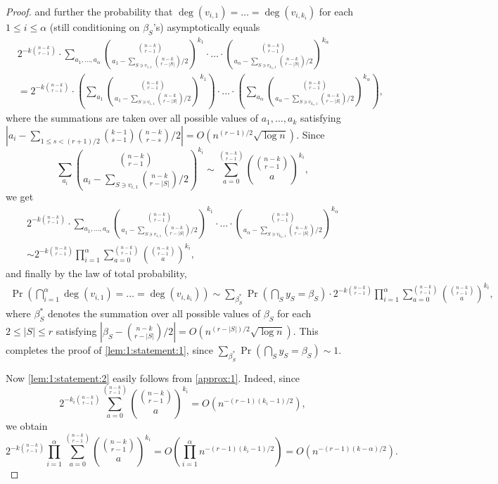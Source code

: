 \documentclass[12pt,reqno]{amsart}
\begin{document}
\begin{proof}
and further the probability that $\deg(v_{i,1}) = \dots = \deg(v_{i,k_i})$ for each $1\le i\le \alpha$ (still conditioning on $\beta_S$'s) asymptotically equals
\begin{align*}
&2^{-k\binom{n-k}{r-1}} \cdot \sum_{a_1,\dots,a_{\alpha}} \binom{\binom{n-k}{r-1}}{a_1-\sum_{S\ni v_{1,1}} {\binom{n-k}{r-|S|}}/{2}}^{k_1} \cdot \ldots \cdot \binom{\binom{n-k}{r-1}}{a_\alpha-\sum_{S\ni v_{k_\alpha,1}} {\binom{n-k}{r-|S|}}/{2}}^{k_\alpha}\\
&=2^{-k\binom{n-k}{r-1}} \cdot \left(\sum_{a_1}\binom{\binom{n-k}{r-1}}{a_1-\sum_{S\ni v_{1,1}} {\binom{n-k}{r-|S|}}/{2}}^{k_1}\right) \cdot \ldots \cdot\left(\sum_{a_{\alpha}} \binom{\binom{n-k}{r-1}}{a_\alpha-\sum_{S\ni v_{k_\alpha,1}} {\binom{n-k}{r-|S|}}/{2}}^{k_\alpha}\right),
\end{align*}
where the summations are taken over all possible values of $a_1,\dots,a_{k}$ satisfying $|a_i - \sum_{1\le s < (r+1)/2}\binom{k-1}{s-1} {\binom{n-k}{r-s}}/{2}| = O(n^{(r-1)/2}\sqrt{\log n})$. Since
\[
\sum_{a_i}  \binom{\binom{n-k}{r-1}}{a_i-\sum_{S\ni v_{i,1}} {\binom{n-k}{r-|S|}}/{2}}^{k_i}
\sim \sum_{a=0}^{\binom{n-k}{r-1}}  \binom{\binom{n-k}{r-1}}{a}^{k_i},
\]
we get
\begin{multline*}
2^{-k\binom{n-k}{r-1}} \cdot \sum_{a_1,\dots,a_{\alpha}} \binom{\binom{n-k}{r-1}}{a_1-\sum_{S\ni v_{1,1}} {\binom{n-k}{r-|S|}}/{2}}^{k_1} \cdot \ldots \cdot \binom{\binom{n-k}{r-1}}{a_\alpha-\sum_{S\ni v_{k_\alpha,1}} {\binom{n-k}{r-|S|}}/{2}}^{k_\alpha}\\
\sim 2^{-k\binom{n-k}{r-1}} \prod_{i=1}^{\alpha} \sum_{a=0}^{\binom{n-k}{r-1}} \binom{\binom{n-k}{r-1}}{a}^{k_i},
\end{multline*}
and finally by the law of total probability,
\begin{align*}
\Pr\left( \bigcap_{i=1}^\alpha \deg(v_{i,1}) = \dots = \deg(v_{i,k_i}) \right)
\sim \sum_{\beta_S^*} \Pr\left( \bigcap_{S} y_S = \beta_S \right) \cdot 2^{-k\binom{n-k}{r-1}} \prod_{i=1}^{\alpha} \sum_{a=0}^{\binom{n-k}{r-1}} \binom{\binom{n-k}{r-1}}{a}^{k_i},
\end{align*}
where $\beta_S^*$ denotes the summation over all possible values of $\beta_S$ for each $2\le |S|\le r$ satisfying $|\beta_S - {\binom{n-k}{r-|S|}}/{2}| = O(n^{(r-|S|)/2}\sqrt{\log n})$. This completes the proof of \eqref{lem:1:statement:1}, since $\sum_{\beta_S^*} \Pr( \bigcap_{S} y_S = \beta_S) \sim 1$.

Now \eqref{lem:1:statement:2} easily follows from \ref{approx:1}. Indeed, since
\[
2^{-k_i\binom{n-k}{r-1}} \sum_{a=0}^{\binom{n-k}{r-1}} \binom{\binom{n-k}{r-1}}{a}^{k_i} = O(n^{-(r-1)(k_i-1)/2}),
\]
we obtain
\[
2^{-k\binom{n-k}{r-1}} \prod_{i=1}^{\alpha} \sum_{a=0}^{\binom{n-k}{r-1}} \binom{\binom{n-k}{r-1}}{a}^{k_i}
= O\left(\prod_{i=1}^{\alpha}n^{-(r-1)(k_i-1)/2}\right)
= O\left(n^{-(r-1)(k-\alpha)/2}\right).
\]
\end{proof}
\end{document}
